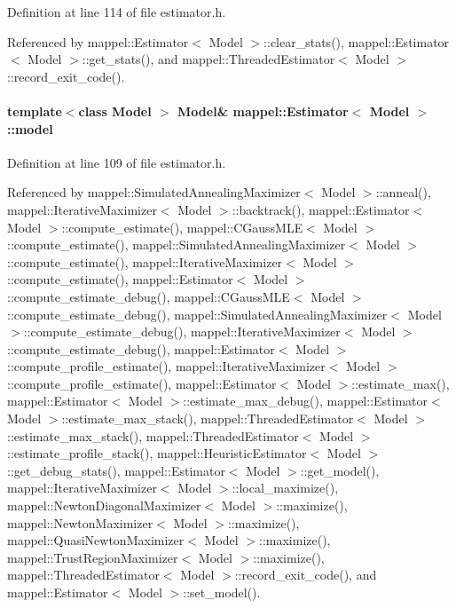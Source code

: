 Definition at line 114 of file estimator.\+h.



Referenced by mappel\+::\+Estimator$<$ Model $>$\+::clear\+\_\+stats(), mappel\+::\+Estimator$<$ Model $>$\+::get\+\_\+stats(), and mappel\+::\+Threaded\+Estimator$<$ Model $>$\+::record\+\_\+exit\+\_\+code().

\paragraph[{\texorpdfstring{model}{model}}]{\setlength{\rightskip}{0pt plus 5cm}template$<$class Model $>$ Model\& {\bf mappel\+::\+Estimator}$<$ Model $>$\+::model\hspace{0.3cm}{\ttfamily [protected]}}\hypertarget{classmappel_1_1Estimator_a8322546d87ccdf01f8b0dcd9dae509f0}{}\label{classmappel_1_1Estimator_a8322546d87ccdf01f8b0dcd9dae509f0}


Definition at line 109 of file estimator.\+h.



Referenced by mappel\+::\+Simulated\+Annealing\+Maximizer$<$ Model $>$\+::anneal(), mappel\+::\+Iterative\+Maximizer$<$ Model $>$\+::backtrack(), mappel\+::\+Estimator$<$ Model $>$\+::compute\+\_\+estimate(), mappel\+::\+C\+Gauss\+M\+L\+E$<$ Model $>$\+::compute\+\_\+estimate(), mappel\+::\+Simulated\+Annealing\+Maximizer$<$ Model $>$\+::compute\+\_\+estimate(), mappel\+::\+Iterative\+Maximizer$<$ Model $>$\+::compute\+\_\+estimate(), mappel\+::\+Estimator$<$ Model $>$\+::compute\+\_\+estimate\+\_\+debug(), mappel\+::\+C\+Gauss\+M\+L\+E$<$ Model $>$\+::compute\+\_\+estimate\+\_\+debug(), mappel\+::\+Simulated\+Annealing\+Maximizer$<$ Model $>$\+::compute\+\_\+estimate\+\_\+debug(), mappel\+::\+Iterative\+Maximizer$<$ Model $>$\+::compute\+\_\+estimate\+\_\+debug(), mappel\+::\+Estimator$<$ Model $>$\+::compute\+\_\+profile\+\_\+estimate(), mappel\+::\+Iterative\+Maximizer$<$ Model $>$\+::compute\+\_\+profile\+\_\+estimate(), mappel\+::\+Estimator$<$ Model $>$\+::estimate\+\_\+max(), mappel\+::\+Estimator$<$ Model $>$\+::estimate\+\_\+max\+\_\+debug(), mappel\+::\+Estimator$<$ Model $>$\+::estimate\+\_\+max\+\_\+stack(), mappel\+::\+Threaded\+Estimator$<$ Model $>$\+::estimate\+\_\+max\+\_\+stack(), mappel\+::\+Threaded\+Estimator$<$ Model $>$\+::estimate\+\_\+profile\+\_\+stack(), mappel\+::\+Heuristic\+Estimator$<$ Model $>$\+::get\+\_\+debug\+\_\+stats(), mappel\+::\+Estimator$<$ Model $>$\+::get\+\_\+model(), mappel\+::\+Iterative\+Maximizer$<$ Model $>$\+::local\+\_\+maximize(), mappel\+::\+Newton\+Diagonal\+Maximizer$<$ Model $>$\+::maximize(), mappel\+::\+Newton\+Maximizer$<$ Model $>$\+::maximize(), mappel\+::\+Quasi\+Newton\+Maximizer$<$ Model $>$\+::maximize(), mappel\+::\+Trust\+Region\+Maximizer$<$ Model $>$\+::maximize(), mappel\+::\+Threaded\+Estimator$<$ Model $>$\+::record\+\_\+exit\+\_\+code(), and mappel\+::\+Estimator$<$ Model $>$\+::set\+\_\+model().

